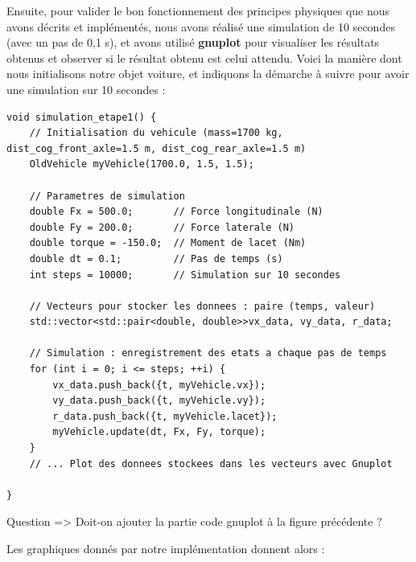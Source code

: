 Ensuite, pour valider le bon fonctionnement des principes physiques que nous avons décrits et implémentés, nous avons réalisé une simulation de 10 secondes (avec un pas de 0,1 s), et avons utilisé \textbf{\gls{gnuplot}} pour visualiser les résultats obtenus et observer si le résultat obtenu est celui attendu.
Voici la manière dont nous initialisons notre objet voiture, et indiquons la démarche à suivre pour avoir une simulation sur 10 secondes :

\begin{lstlisting}[style=CStyle,label={lst:void_simulation_etape1}]
void simulation_etape1() {
    // Initialisation du vehicule (mass=1700 kg, dist_cog_front_axle=1.5 m, dist_cog_rear_axle=1.5 m)
    OldVehicle myVehicle(1700.0, 1.5, 1.5);

    // Parametres de simulation
    double Fx = 500.0;       // Force longitudinale (N)
    double Fy = 200.0;       // Force laterale (N)
    double torque = -150.0;  // Moment de lacet (Nm)
    double dt = 0.1;         // Pas de temps (s)
    int steps = 10000;       // Simulation sur 10 secondes

    // Vecteurs pour stocker les donnees : paire (temps, valeur)
    std::vector<std::pair<double, double>>vx_data, vy_data, r_data;

    // Simulation : enregistrement des etats a chaque pas de temps
    for (int i = 0; i <= steps; ++i) {
        vx_data.push_back({t, myVehicle.vx});
        vy_data.push_back({t, myVehicle.vy});
        r_data.push_back({t, myVehicle.lacet});
        myVehicle.update(dt, Fx, Fy, torque);
    }
    // ... Plot des donnees stockees dans les vecteurs avec Gnuplot

}
\end{lstlisting}

{\LARGE Question => Doit-on ajouter la partie code \gls{gnuplot} à la figure précédente ?}

Les graphiques donnés par notre implémentation donnent alors :

